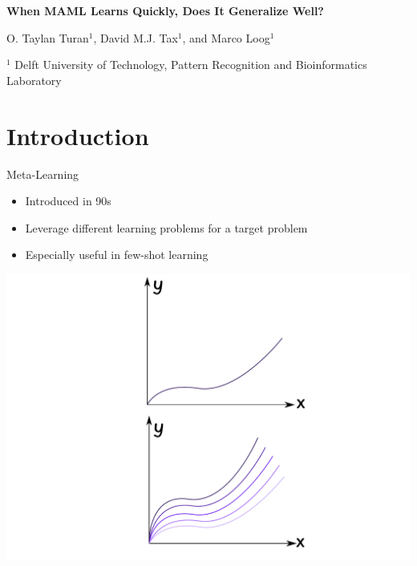 \documentclass[aspectratio=169]{beamer}
\author{\authorlabel}
\newcommand{\mysubtitle}{\color{Pink}\Large{\textbf{When MAML Learns Quickly, Does It Generalize Well?}}}
\newcommand{\inst}[1]{$^\text{#1}$}
\newcommand{\authors}{O. Taylan Turan\inst{1}, 
David M.J. Tax\inst{1}, and 
Marco Loog\inst{1}}
\renewcommand{\institute}{\small{$^\text{1}$ Delft University of Technology, Pattern Recognition and Bioinformatics Laboratory}}
\begin{document}


\begin{frame}

  \vspace{1cm}

	\centering

	\mysubtitle

  \vspace{1cm}

  \authors
  
  \vspace{3cm}

  \institute

\end{frame}


\section{Introduction}
\begin{frame}{Meta-Learning}
  \begin{minipage}{0.5\textwidth}
    \begin{itemize}
      \item Introduced in 90s
      \item Leverage different learning problems for a target problem
      \item Especially useful in few-shot learning
    \end{itemize}
  \end{minipage}%
  \begin{minipage}{0.5\textwidth}
    \centering
    \includegraphics[width=\textwidth]{figures/meta_learning}
  \end{minipage}
\end{frame}
\end{document}
